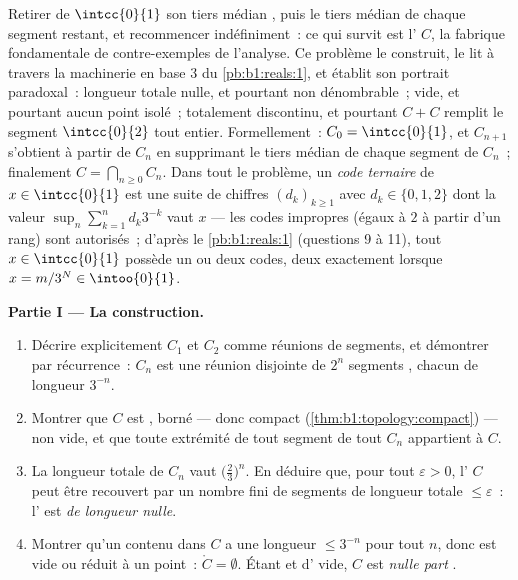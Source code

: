 \begin{problem}[{Devoir maison --- l'\omterm{def:b1:logic:sets}{ensemble} triadique de Cantor~:
longueur nulle, non dénombrable, parfait, et $C + C =
\intcc{0}{2}$}]
\label{pb:b1:topology:1}
Retirer de $\intcc{0}{1}$ son tiers médian , puis le tiers
médian de chaque segment restant, et recommencer indéfiniment~: ce
qui survit est l'\emph{} $C$, la fabrique
fondamentale de contre-exemples de l'analyse. Ce problème le
construit, le lit à travers la machinerie en base $3$ du
\cref{pb:b1:reals:1}, et établit son portrait paradoxal~: longueur
totale nulle, et pourtant non dénombrable~;  vide, et
pourtant aucun point isolé~; totalement discontinu, et pourtant
$C + C$ remplit le segment $\intcc{0}{2}$ tout
entier. Formellement~: $C_0 = \intcc{0}{1}$,
et $C_{n+1}$ s'obtient à partir de $C_n$ en supprimant le tiers
médian  de chaque segment de $C_n$~; finalement $C =
\bigcap_{n \geq 0} C_n$. Dans tout le problème, un \emph{code
ternaire} de $x \in \intcc{0}{1}$ est une suite de chiffres
$(d_k)_{k\geq1}$ avec $d_k \in \{0, 1, 2\}$ dont la valeur
$\sup_n \sum_{k=1}^n d_k 3^{-k}$ vaut $x$ --- les codes impropres
(égaux à $2$ à partir d'un rang) sont autorisés~; d'après
le \cref{pb:b1:reals:1} (questions 9 à 11), tout $x \in
\intcc{0}{1}$ possède un ou deux codes, deux exactement lorsque
$x = m/3^N \in \intoo{0}{1}$.

\medskip
\noindent\textbf{Partie I --- La construction.}
\begin{enumerate}
  \item Décrire explicitement $C_1$ et $C_2$ comme réunions de
        segments, et démontrer par récurrence~: $C_n$ est une
        réunion disjointe de $2^n$ segments , chacun de
        longueur $3^{-n}$.
  \item Montrer que $C$ est , borné --- donc compact
        (\cref{thm:b1:topology:compact}) --- non vide, et que
        toute extrémité de tout segment de tout $C_n$ appartient
        à $C$.
  \item La longueur totale de $C_n$ vaut $\bigl(\frac23\bigr)^n$.
        En déduire que, pour tout $\varepsilon > 0$, l'
        $C$ peut être recouvert par un nombre fini de segments de
        longueur totale $\leq \varepsilon$~: l'
        est \emph{de longueur nulle}.
  \item Montrer qu'un  contenu dans $C$ a une longueur
        $\leq 3^{-n}$ pour tout $n$, donc est vide ou réduit à un
        point~: $\mathring C = \emptyset$. Étant  et
        d' vide, $C$ est \emph{nulle part }.
\end{enumerate}


\end{problem}

